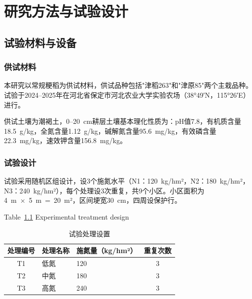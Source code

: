 
\chapter{研究方法与试验设计}
\label{chap:method_design}

\section{试验材料与设备}
\label{sec:materials}

\subsection{供试材料}
\label{subsec:test_materials}

本研究以常规粳稻为供试材料，供试品种包括"津稻263"和"津原85"两个主栽品种。试验于2024--2025年在河北省保定市河北农业大学实验农场（38°49′N，115°26′E）进行。

供试土壤为潮褐土，0--20~cm耕层土壤基本理化性质为：pH值7.8，有机质含量18.5~g/kg，全氮含量1.12~g/kg，碱解氮含量95.6~mg/kg，有效磷含量22.3~mg/kg，速效钾含量156.8~mg/kg。

\subsection{试验设计}
\label{subsec:exp_design}

试验采用随机区组设计，设3个施氮水平（N1：120~kg/hm²，N2：180~kg/hm²，N3：240~kg/hm²），每个处理设3次重复，共9个小区。小区面积为4~m~×~5~m~=~20~m²，区间埂宽30~cm，四周设保护行。

\begin{table}[htbp]
  \centering
  \caption{试验处理设置}
  \label{tab:treatments}
  \bigskip
  {\normalfont Table~\ref{tab:treatments} Experimental treatment design}\\[4pt]
  \begin{tabular}{cllc}
    \toprule
    处理编号 & 处理名称 & 施氮量（kg/hm²） & 重复次数 \\
    \midrule
    T1 & 低氮 & 120 & 3 \\
    T2 & 中氮 & 180 & 3 \\
    T3 & 高氮 & 240 & 3 \\
    \bottomrule
  \end{tabular}
\end{table}


